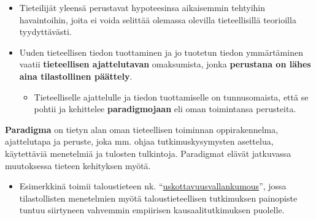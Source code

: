\documentclass[
]{book}
\providecommand{\tightlist}{%
  \setlength{\itemsep}{0pt}\setlength{\parskip}{0pt}}
\begin{document}
\hfill\break

\begin{itemize}
\tightlist
\item
  Tieteilijät yleensä perustavat hypoteesinsa aikaisemmin tehtyihin havaintoihin, joita ei voida selittää olemassa olevilla tieteellisillä teorioilla tyydyttävästi.
\item
  Uuden tieteellisen tiedon tuottaminen ja jo tuotetun tiedon ymmärtäminen vaatii \textbf{tieteellisen ajattelutavan} omaksumista, jonka \textbf{perustana on lähes aina tilastollinen päättely}.

  \begin{itemize}
  \tightlist
  \item
    Tieteelliselle ajattelulle ja tiedon tuottamiselle on tunnusomaista, että se pohtii ja kehittelee \textbf{paradigmojaan} eli oman toimintansa perusteita.
  \end{itemize}
\end{itemize}

\begin{defblock}{}

\textbf{Paradigma} on tietyn alan oman tieteellisen toiminnan oppirakennelma, ajattelutapa ja peruste, joka mm. ohjaa tutkimuskysymysten asettelua, käytettäviä menetelmiä ja tulosten tulkintoja. Paradigmat elävät jatkuvassa muutoksessa tieteen kehityksen myötä.

\begin{itemize}
\tightlist
\item
  Esimerkkinä toimii taloustieteen nk. ``\href{https://www.taloustieteellinenyhdistys.fi/wp-content/uploads/2019/10/KAK_3_2019_nettiin-5-8.pdf}{uskottavuusvallankumous}'', jossa tilastollisten menetelmien myötä taloustieteellisen tutkimuksen painopiste tuntuu siirtyneen vahvemmin empiirisen kausaalitutkimuksen puolelle.
\end{itemize}

\end{defblock}
\end{document}

